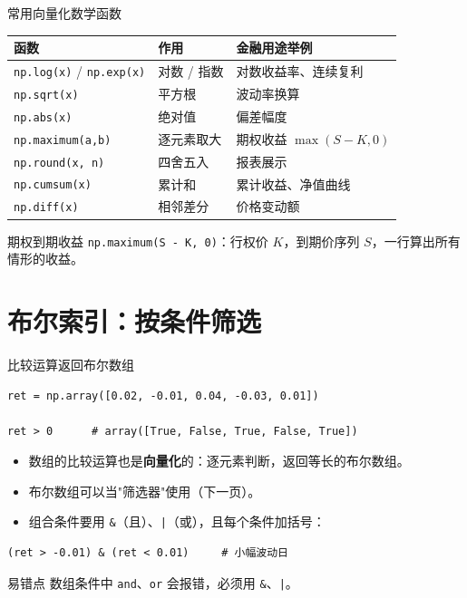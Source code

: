 \documentclass[9pt]{ctexbeamer}
\begin{document}
\begin{frame}[fragile]{常用向量化数学函数}
	\begin{table}
		\centering
		\begin{tabular}{lll}
			\toprule
			函数 & 作用 & 金融用途举例 \\
			\midrule
			\texttt{np.log(x)} / \texttt{np.exp(x)} & 对数 / 指数 & 对数收益率、连续复利 \\
			\texttt{np.sqrt(x)} & 平方根 & 波动率换算 \\
			\texttt{np.abs(x)} & 绝对值 & 偏差幅度 \\
			\texttt{np.maximum(a,b)} & 逐元素取大 & 期权收益 $\max(S-K,0)$ \\
			\texttt{np.round(x, n)} & 四舍五入 & 报表展示 \\
			\texttt{np.cumsum(x)} & 累计和 & 累计收益、净值曲线 \\
			\texttt{np.diff(x)} & 相邻差分 & 价格变动额 \\
			\bottomrule
		\end{tabular}
	\end{table}
	\begin{exampleblock}{期权到期收益}
		\texttt{np.maximum(S - K, 0)}：行权价 $K$，到期价序列 $S$，一行算出所有情形的收益。
	\end{exampleblock}
\end{frame}


\section{布尔索引：按条件筛选}

\begin{frame}[fragile]{比较运算返回布尔数组}
	\begin{lstlisting}
ret = np.array([0.02, -0.01, 0.04, -0.03, 0.01])

ret > 0      # array([True, False, True, False, True])
\end{lstlisting}
	\begin{itemize}
		\item 数组的比较运算也是\textbf{向量化}的：逐元素判断，返回等长的布尔数组。
		\item 布尔数组可以当"筛选器"使用（下一页）。
		\item 组合条件要用 \texttt{\&}（且）、\texttt{|}（或），且每个条件加括号：
	\end{itemize}
	\begin{lstlisting}
(ret > -0.01) & (ret < 0.01)     # 小幅波动日
\end{lstlisting}
	\begin{alertblock}{易错点}
		数组条件中 \texttt{and}、\texttt{or} 会报错，必须用 \texttt{\&}、\texttt{|}。
	\end{alertblock}
\end{frame}
\end{document}
